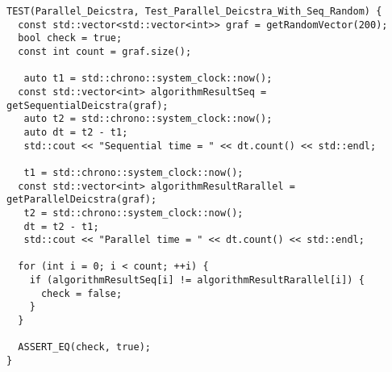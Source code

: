 \documentclass{report}
\begin{document}
\begin{lstlisting}
TEST(Parallel_Deicstra, Test_Parallel_Deicstra_With_Seq_Random) {
  const std::vector<std::vector<int>> graf = getRandomVector(200);
  bool check = true;
  const int count = graf.size();

   auto t1 = std::chrono::system_clock::now();
  const std::vector<int> algorithmResultSeq = getSequentialDeicstra(graf);
   auto t2 = std::chrono::system_clock::now();
   auto dt = t2 - t1;
   std::cout << "Sequential time = " << dt.count() << std::endl;

   t1 = std::chrono::system_clock::now();
  const std::vector<int> algorithmResultRarallel = getParallelDeicstra(graf);
   t2 = std::chrono::system_clock::now();
   dt = t2 - t1;
   std::cout << "Parallel time = " << dt.count() << std::endl;

  for (int i = 0; i < count; ++i) {
    if (algorithmResultSeq[i] != algorithmResultRarallel[i]) {
      check = false;
    }
  }

  ASSERT_EQ(check, true);
}


\end{lstlisting}
\end{document}
